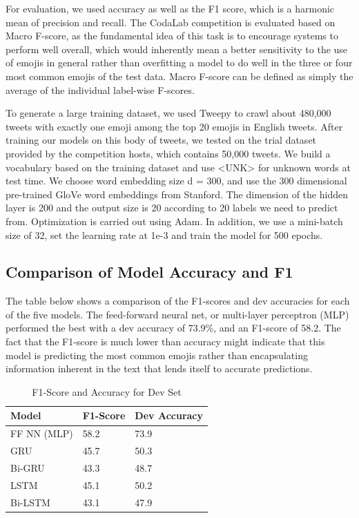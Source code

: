\documentclass[11pt,a4paper]{article}
\begin{document}
For evaluation, we used accuracy as well as the F1 score, which is a harmonic mean of precision and recall. The CodaLab competition is evaluated based on Macro F-score, as the fundamental idea of this task is to encourage systems to perform well overall, which would inherently mean a better sensitivity to the use of emojis in general rather than overfitting a model to do well in the  three or four most common emojis of the test data. Macro F-score can be defined as simply the average of the individual label-wise F-scores.


\par
To generate a large training dataset, we used Tweepy to crawl about 480,000 tweets with exactly one emoji among the top 20 emojis in English tweets. After training our models on this body of tweets, we tested on the trial dataset provided by the competition hosts, which contains 50,000 tweets. We build a vocabulary based on the training dataset and use <UNK> for unknown words at test time. We choose word embedding size d = 300, and use the 300 dimensional pre-trained GloVe word embeddings from Stanford. The dimension of the hidden layer is 200 and the output size is 20 according to 20 labels we need to predict from. Optimization is carried out using Adam. In addition, we use a mini-batch size of 32, set the learning rate at 1e-3 and train the model for 500 epochs.


\subsection{Comparison of Model Accuracy and F1}
The table below shows a comparison of the F1-scores and dev accuracies for each of the five models. The feed-forward neural net, or multi-layer perceptron (MLP) performed the best with a dev accuracy of 73.9\%, and an F1-score of 58.2. The fact that the F1-score is much lower than accuracy might indicate that this model is predicting the most common emojis rather than encapsulating information inherent in the text that lends itself to accurate predictions.
	\begin{table}[htp]
		\centering
		\caption{F1-Score and Accuracy for Dev Set}
		\label{my-label}
		\begin{tabular}{@{}lll@{}}
			\toprule
			Model       & F1-Score & Dev Accuracy \\ \midrule
			FF NN (MLP) & 58.2     & 73.9         \\
			GRU         & 45.7     & 50.3         \\
			Bi-GRU      & 43.3        & 48.7            \\
			LSTM        & 45.1     & 50.2         \\
			Bi-LSTM     & 43.1       & 47.9            \\ \bottomrule
		\end{tabular}
	\end{table}
\end{document}
